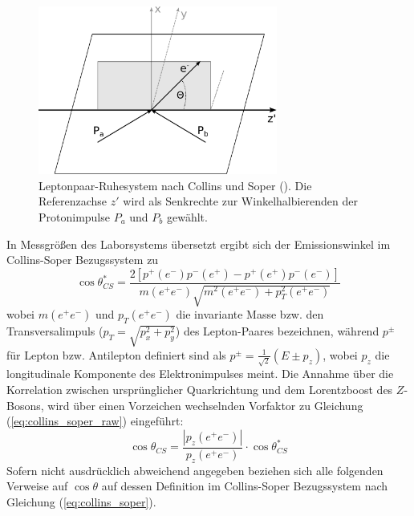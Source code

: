 \begin{figure}
    \centering
    \includegraphics[width=0.7\textwidth]{img/collins_soper}
    \caption[Leptonpaar-Ruhesystem nach Collins und Soper]
        {Leptonpaar-Ruhesystem nach Collins und Soper (\cite{Collins:1977iv}).
        Die Referenzachse $z'$ wird als Senkrechte zur Winkelhalbierenden der
        Protonimpulse $P_a$ und $P_b$ gewählt.}
    \label{fig:collins_soper}
\end{figure}

\pagebreak

In Messgrößen des Laborsystems übersetzt ergibt sich der Emissionswinkel im
Collins-Soper Bezugssystem zu
\begin{equation}
    \cos\theta^*_{CS} = \frac{2\left[ p^+(e^-)p^-(e^+)-p^+(e^+)p^-(e^-)\right]}
        {m(e^+e^-) \sqrt{m^2(e^+e^-)+p_T^2(e^+e^-)}}
    \label{eq:collins_soper_raw}
\end{equation}
wobei $m(e^+e^-)$ und $p_T(e^+e^-)$ die invariante Masse bzw. den
Transversalimpuls ($p_T = \sqrt{p_x^2+p_y^2}$) des Lepton-Paares bezeichnen,
während $p^\pm$ für Lepton bzw. Antilepton definiert sind als
$p^\pm = \tfrac{1}{\sqrt{2}}(E\pm p_z)$, wobei $p_z$ die longitudinale
Komponente des Elektronimpulses meint. Die Annahme über die Korrelation
zwischen ursprünglicher Quarkrichtung und dem Lorentzboost des $Z$-Bosons, wird
über einen Vorzeichen wechselnden Vorfaktor zu Gleichung
(\ref{eq:collins_soper_raw}) eingeführt:
\begin{equation}
    \cos\theta_{CS} = \frac{|p_z(e^+e^-)|}{p_z(e^+e^-)} \cdot \cos\theta^*_{CS}
    \label{eq:collins_soper}
\end{equation}
Sofern nicht ausdrücklich abweichend angegeben beziehen sich alle folgenden
Verweise auf $\cos\theta$ auf dessen Definition im Collins-Soper Bezugssystem
nach Gleichung (\ref{eq:collins_soper}).

